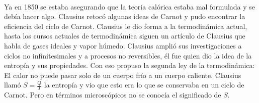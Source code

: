 \\
Ya en 1850 se estaba asegurando que la teoría calórica estaba mal formulada y se debía hacer algo. Clausius retocó algunas ideas de Carnot y pudo encontrar la eficiencia del ciclo de Carnot. Clausius le dio forma a la termodinámica actual, hasta los cursos actuales de termodinámica siguen un artículo de Clausius que habla de gases ideales y vapor húmedo. Clausius amplió sus investigaciones a ciclos no infinitesimales y a procesos no reversibles, él fue quien dio la idea de la entropía y sus propiedades. Con eso propuso la segunda ley de la termodinámica: El calor no puede pasar solo de un cuerpo frío a un cuerpo caliente. Clausius llamó $S=\frac{Q}{T}$ la entropía y vio que esto era lo que se conservaba en un ciclo de Carnot. Pero en términos microscópicos no se conocía el significado de $S$.
\\
